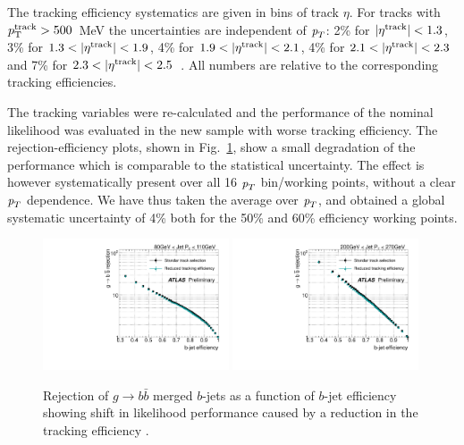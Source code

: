The tracking efficiency systematics are given in bins of track $\eta$. For tracks with $p_{\rm{T}}^{\rm{track}} > 500$~MeV the uncertainties are independent of ${\emph{p}_{T}}$:  2\% for $|\eta^{\rm{track}}|<1.3$, 3\% for $1.3<|\eta^{\rm{track}}|<1.9$, 4\% for $1.9<|\eta^{\rm{track}}|<2.1$, 4\% for $2.1<|\eta^{\rm{track}}|<2.3$ and 7\% for $2.3<|\eta^{\rm{track}}|<2.5$~\cite{chargemultiplicity}. All numbers are relative to the corresponding tracking efficiencies.  

The tracking variables were re-calculated and the performance of the nominal likelihood was evaluated in the new sample with worse tracking efficiency. The rejection-efficiency plots, shown in Fig.~\ref{fig:trackefficiency}, show a small degradation of the performance which is comparable to the statistical uncertainty. The effect is however systematically present over all 16 ${\emph{p}_{T}}$ bin/working points, without a clear ${\emph{p}_{T}}$ dependence. We have thus taken the average over ${\emph{p}_{T}}$, and obtained a global systematic uncertainty of 4\% both for the 50\% and 60\% efficiency working points.

\begin{figure}[tp]
\centering
\includegraphics[width=0.49\textwidth]{FIGS/systematics/LlhoodKDE_ISO_TrackingUncertaintyTest_rejvseff080.pdf}
\includegraphics[width=0.49\textwidth]{FIGS/systematics/LlhoodKDE_ISO_TrackingUncertaintyTest_rejvseff200.pdf}
\caption{Rejection of $g\rightarrow b \bar{b}$ merged $b$-jets as a function of $b$-jet efficiency showing shift in likelihood performance caused by a reduction in the tracking efficiency .}
\label{fig:trackefficiency}
\end{figure}

